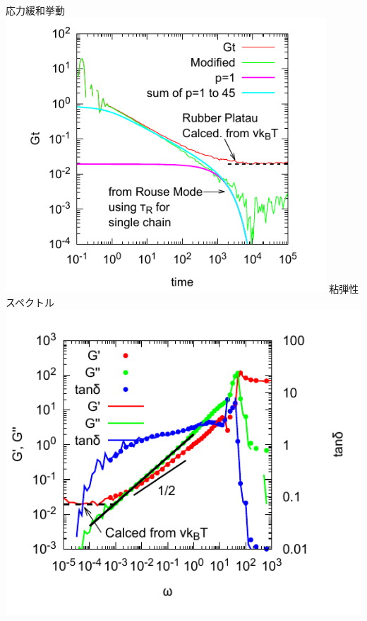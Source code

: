 \documentclass[12pt, dvipdfmx]{beamer}
\begin{document}
\begin{frame}
\begin{columns}[totalwidth=1\textwidth]
				応力緩和挙動
				\includegraphics[width=0.9\textwidth]{Gt_loglog.pdf}
				\scriptsize
				粘弾性スペクトル
				\includegraphics[width=\textwidth]{N_44_Freq_Sweep.pdf}
		\end{columns}
\end{frame}
\end{document}
